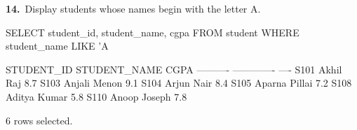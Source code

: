\noindent\begin{minipage}{\linewidth}
\begingroup{}
{\fontsize{14}{17}\selectfont\textbf{14.}}\ Display students whose names begin with the letter A.\par
\endgroup\vspace{12pt}


\begin{sqlcode}
SELECT student_id, student_name, cgpa
FROM student WHERE student_name LIKE 'A%
\end{sqlcode}

\vspace{18pt}


\begin{sqlout}[fontsize=\small]
STUDENT_ID  STUDENT_NAME   CGPA
----------  -------------  ----
S101        Akhil Raj       8.7
S103        Anjali Menon    9.1
S104        Arjun Nair      8.4
S105        Aparna Pillai   7.2
S108        Aditya Kumar    5.8
S110        Anoop Joseph    7.8

6 rows selected.
\end{sqlout}
\end{minipage}\par\vspace{24pt}

